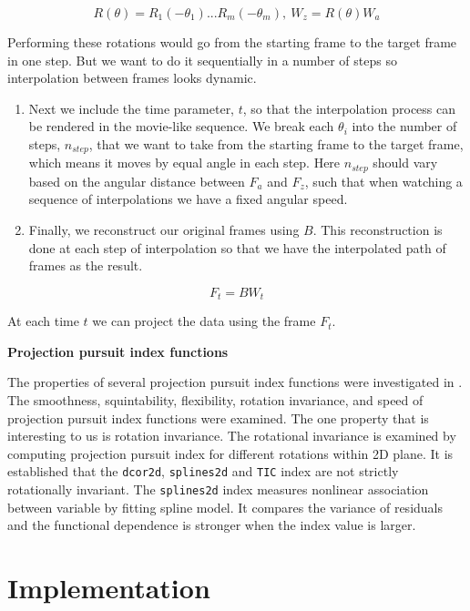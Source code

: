 \[R(\theta) = R_1(-\theta_1) ... R_m(-\theta_m), \    W_z = R(\theta)W_a\]

Performing these rotations would go from the starting frame to the
target frame in one step. But we want to do it sequentially in a number
of steps so interpolation between frames looks dynamic.

\begin{enumerate}
\def\labelenumi{\arabic{enumi}.}
\setcounter{enumi}{4}
\item
  Next we include the time parameter, \(t\), so that the interpolation
  process can be rendered in the movie-like sequence. We break each
  \(\theta_i\) into the number of steps, \(n_{step}\), that we want to
  take from the starting frame to the target frame, which means it moves
  by equal angle in each step. Here \(n_{step}\) should vary based on
  the angular distance between \(F_a\) and \(F_z\), such that when
  watching a sequence of interpolations we have a fixed angular speed.
\item
  Finally, we reconstruct our original frames using \(B\). This
  reconstruction is done at each step of interpolation so that we have
  the interpolated path of frames as the result.
\end{enumerate}

\[F_t = B  W_t\]

At each time \(t\) we can project the data using the frame \(F_t\).

\textbf{Projection pursuit index functions}

The properties of several projection pursuit index functions were
investigated in \citet{pp}. The smoothness, squintability, flexibility,
rotation invariance, and speed of projection pursuit index functions
were examined. The one property that is interesting to us is rotation
invariance. The rotational invariance is examined by computing
projection pursuit index for different rotations within 2D plane. It is
established that the \texttt{dcor2d}, \texttt{splines2d} and
\texttt{TIC} index are not strictly rotationally invariant. The
\texttt{splines2d} index measures nonlinear association between variable
by fitting spline model. It compares the variance of residuals and the
functional dependence is stronger when the index value is larger.

\hypertarget{implementation}{%
\section{Implementation}\label{implementation}}


